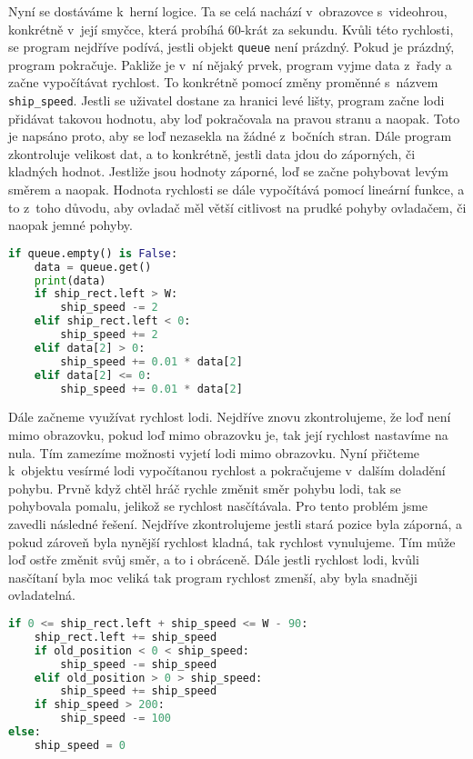 \documentclass[12pt]{report}			%
\begin{document}
Nyní se dostáváme k~herní logice. Ta se celá nachází v~obrazovce s~videohrou, konkrétně v~její smyčce, která probíhá 60-krát za sekundu. Kvůli této rychlosti, se program nejdříve podívá, jestli objekt \texttt{queue} není prázdný. Pokud je prázdný, program pokračuje. Pakliže je v~ní nějaký prvek, program vyjme data z~řady a začne vypočítávat rychlost. 
To konkrétně pomocí změny proměnné s~názvem \texttt{ship\_speed}. Jestli se uživatel dostane za hranici levé lišty, program začne lodi přidávat takovou hodnotu, aby loď pokračovala na pravou stranu a naopak. Toto je napsáno proto, aby se loď nezasekla na žádné z~bočních stran. Dále program zkontroluje velikost dat, 
a to konkrétně, jestli data jdou do záporných, či kladných hodnot. Jestliže jsou hodnoty záporné, loď se začne pohybovat levým směrem a naopak. Hodnota rychlosti se dále vypočítává pomocí lineární funkce, a to z~toho důvodu, aby ovladač měl větší citlivost na prudké pohyby ovladačem, či naopak jemné pohyby. 



\begin{lstlisting}[title={Program game.py}, caption={game.py}, language=Python]
if queue.empty() is False:
	data = queue.get()
    print(data)
    if ship_rect.left > W: 
        ship_speed -= 2
    elif ship_rect.left < 0:  
        ship_speed += 2
    elif data[2] > 0:
        ship_speed += 0.01 * data[2] 
    elif data[2] <= 0:
        ship_speed += 0.01 * data[2]

\end{lstlisting}


Dále začneme využívat rychlost lodi. Nejdříve znovu zkontrolujeme, že loď není mimo obrazovku, pokud loď mimo obrazovku je, tak její rychlost nastavíme na nula. Tím zamezíme možnosti vyjetí lodi 
mimo obrazovku. Nyní přičteme k~objektu vesírmé lodi vypočítanou rychlost a pokračujeme v~dalším doladění pohybu. Prvně když chtěl hráč rychle změnit směr pohybu lodi, tak se pohybovala pomalu, jelikož se rychlost nasčítávala. Pro tento problém jsme zavedli následné řešení. Nejdříve zkontrolujeme jestli stará pozice byla záporná, a pokud zároveň byla nynější rychlost kladná, tak rychlost vynulujeme. Tím může loď ostře změnit svůj směr, a to i obráceně. Dále jestli rychlost lodi, kvůli nasčítaní byla moc veliká tak program rychlost zmenší, aby byla snadněji ovladatelná. 



\begin{lstlisting}[title={Program game.py}, caption={game.py}, language=Python]
if 0 <= ship_rect.left + ship_speed <= W - 90: 
    ship_rect.left += ship_speed
    if old_position < 0 < ship_speed:  
        ship_speed -= ship_speed
    elif old_position > 0 > ship_speed:  
        ship_speed += ship_speed
    if ship_speed > 200:  
        ship_speed -= 100
else:
    ship_speed = 0

\end{lstlisting}
\end{document}
